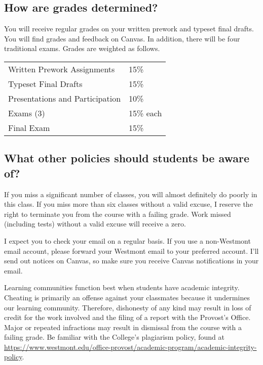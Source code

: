 \documentclass[
  twoside]{article}
\begin{document}
\hypertarget{how-are-grades-determined}{%
\subsection{How are grades
determined?}\label{how-are-grades-determined}}

You will receive regular grades on your written prework and typeset
final drafts. You will find grades and feedback on Canvas. In addition,
there will be four traditional exams. Grades are weighted as follows.

\begin{tabular}[t]{ll}
\toprule
Written Prework Assignments & 15\%\\
Typeset Final Drafts & 15\%\\
Presentations and Participation & 10\%\\
Exams (3) & 15\% each\\
Final Exam & 15\%\\
\bottomrule
\end{tabular}

\hypertarget{what-other-policies-should-students-be-aware-of}{%
\subsection{What other policies should students be aware
of?}\label{what-other-policies-should-students-be-aware-of}}

If you miss a significant number of classes, you will almost definitely
do poorly in this class. If you miss more than six classes without a
valid excuse, I reserve the right to terminate you from the course with
a failing grade. Work missed (including tests) without a valid excuse
will receive a zero.

I expect you to check your email on a regular basis. If you use a
non-Westmont email account, please forward your Westmont email to your
preferred account. I'll send out notices on Canvas, so make sure you
receive Canvas notifications in your email.

Learning communities function best when students have academic
integrity. Cheating is primarily an offense against your classmates
because it undermines our learning community. Therefore, dishonesty of
any kind may result in loss of credit for the work involved and the
filing of a report with the Provost's Office. Major or repeated
infractions may result in dismissal from the course with a failing
grade. Be familiar with the College's plagiarism policy, found at
\url{https://www.westmont.edu/office-provost/academic-program/academic-integrity-policy}.
\end{document}
